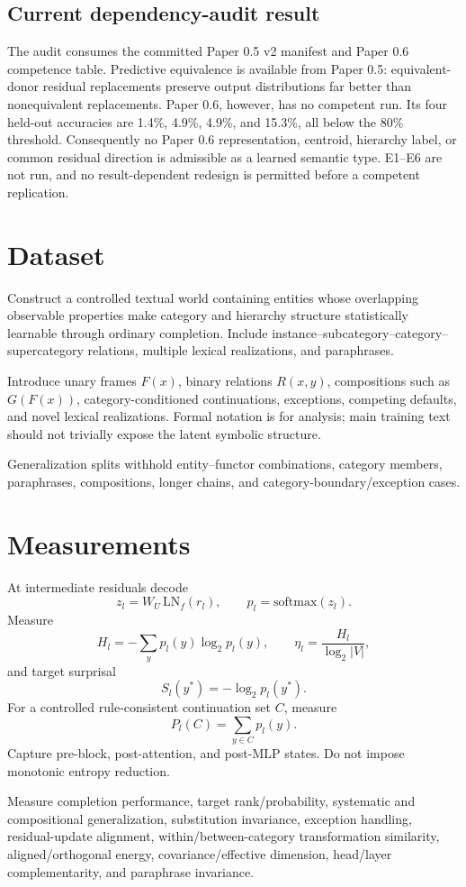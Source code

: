 \documentclass[11pt]{article}
\begin{document}
\subsection{Current dependency-audit result}
The audit consumes the committed Paper 0.5 v2 manifest and Paper 0.6 competence table. Predictive equivalence is available from Paper 0.5: equivalent-donor residual replacements preserve output distributions far better than nonequivalent replacements. Paper 0.6, however, has no competent run. Its four held-out accuracies are 1.4\%, 4.9\%, 4.9\%, and 15.3\%, all below the 80\% threshold. Consequently no Paper 0.6 representation, centroid, hierarchy label, or common residual direction is admissible as a learned semantic type. E1--E6 are not run, and no result-dependent redesign is permitted before a competent replication.

\section{Dataset}
Construct a controlled textual world containing entities whose overlapping observable properties make category and hierarchy structure statistically learnable through ordinary completion. Include instance--subcategory--category--supercategory relations, multiple lexical realizations, and paraphrases.

Introduce unary frames $F(x)$, binary relations $R(x,y)$, compositions such as $G(F(x))$, category-conditioned continuations, exceptions, competing defaults, and novel lexical realizations. Formal notation is for analysis; main training text should not trivially expose the latent symbolic structure.

Generalization splits withhold entity--functor combinations, category members, paraphrases, compositions, longer chains, and category-boundary/exception cases.

\section{Measurements}
At intermediate residuals decode
\[
z_l=W_U\,\mathrm{LN}_f(r_l),\qquad p_l=\mathrm{softmax}(z_l).
\]
Measure
\[
H_l=-\sum_y p_l(y)\log_2p_l(y),\qquad
\eta_l=\frac{H_l}{\log_2|V|},
\]
and target surprisal
\[
S_l(y^*)=-\log_2p_l(y^*).
\]
For a controlled rule-consistent continuation set $C$, measure
\[
P_l(C)=\sum_{y\in C}p_l(y).
\]
Capture pre-block, post-attention, and post-MLP states. Do not impose monotonic entropy reduction.

Measure completion performance, target rank/probability, systematic and compositional generalization, substitution invariance, exception handling, residual-update alignment, within/between-category transformation similarity, aligned/orthogonal energy, covariance/effective dimension, head/layer complementarity, and paraphrase invariance.
\end{document}
